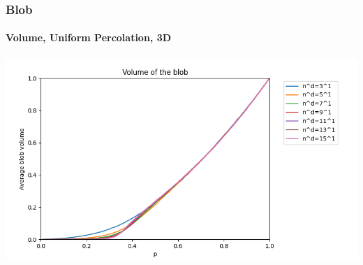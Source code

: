 \documentclass{beamer}
\begin{document}
	\begin{frame}
		\frametitle{Blob}
		\framesubtitle{Volume, Uniform Percolation, 3D}
		\includegraphics[scale=0.5]{imgs/blob_vol_3D_bis.png}
	\end{frame}
\end{document}
